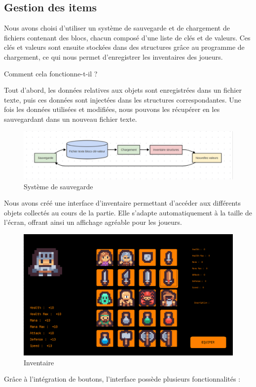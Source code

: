 \documentclass[a4paper,11pt]{article}
\begin{document}
\newpage

\subsection{Gestion des items}


Nous avons choisi d'utiliser un système de sauvegarde et de chargement de fichiers contenant des blocs, chacun composé d'une liste de clés et de valeurs. Ces clés et valeurs sont ensuite stockées dans des structures grâce au programme de chargement, ce qui nous permet d'enregistrer les inventaires des joueurs.\

\begin{center} 
Comment cela fonctionne-t-il ? 
\end{center} Tout d'abord, les données relatives aux objets sont enregistrées dans un fichier texte, puis ces données sont injectées dans les structures correspondantes. Une fois les données utilisées et modifiées, nous pouvons les récupérer en les sauvegardant dans un nouveau fichier texte.

\begin{figure}[h]
    \centering 
    \includegraphics[width=1\linewidth]{./img/systemeSauvegarde.png} 
    \caption{Système de sauvegarde} 
    \label{fig:sauvegarde} 
\end{figure}
 

Nous avons créé une interface d'inventaire permettant d'accéder aux différents objets collectés au cours de la partie. Elle s'adapte automatiquement à la taille de l'écran, offrant ainsi un affichage agréable pour les joueurs.

\begin{figure}[h] 
    \centering 
    \includegraphics[width=0.4\linewidth]{./img/inventaire.png} 
    \caption{Inventaire} 
\end{figure} Grâce à l'intégration de boutons, l'interface possède plusieurs fonctionnalités :
\end{document}
